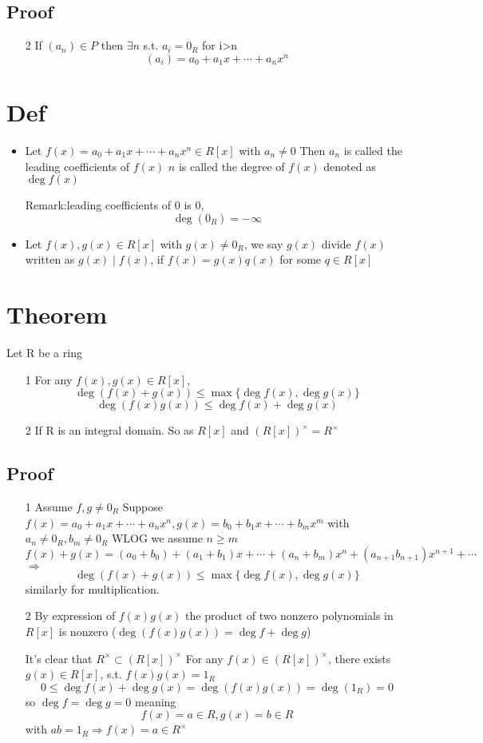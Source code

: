 \documentclass{book}
\begin{document}
\subsection*{Proof}
\begin{itemize}
	\item[2]If $(a_n)\in P$ then $\exists n$ s.t. $a_i=0_R$ for i>n$$(a_i)= a_0+a_1x+\cdots+a_nx^n$$
\end{itemize}
\section{Def}
\begin{itemize}
	\item Let $f(x)=a_0+a_1x+\cdots+a_nx^n\in R[x]$ with $a_n\neq 0$ Then $a_n$ is called the leading coefficients of $f(x)$ $n$ is called the degree of $f(x)$ denoted as $\deg f(x)$
	
	Remark:leading coefficients of 0 is 0, $$\deg(0_R)=-\infty$$
	\item Let $f(x),g(x)\in R[x]$ with $g(x)\neq 0_R$, we say $g(x)$ divide $f(x)$ written as $g(x)\mid f(x)$, if $f(x)=g(x)q(x)$ for some $q\in R[x]$
\end{itemize}
\section{Theorem}
Let R be a ring 
\begin{itemize}
	\item [1]For any $f(x),g(x)\in R[x]$, $$\deg(f(x)+g(x))\leq \max\{\deg f(x),\deg g(x)\}$$
	$$\deg(f(x)g(x))\leq\deg f(x)+\deg g(x)$$
	\item [2]If R is an integral domain. So as $R[x]$ and $(R[x])^\times=R^\times$
\end{itemize}
\subsection{Proof}
\begin{itemize}
	\item [1]Assume $f,g\neq 0_R$ Suppose $f(x)=a_0+a_1x+\cdots+a_nx^n,g(x)=b_0+b_1x+\cdots+b_mx^m$ with $a_n\neq 0_R,b_m\neq 0_R$ WLOG we assume $n\geq m$$$f(x)+g(x)=(a_0+b_0)+(a_1+b_1)x+\cdots+(a_n+b_m)x^n+(a_{n+1}b_{n+1})x^{n+1}+\cdots$$$\Rightarrow$$$\deg(f(x)+g(x))\leq \max\{\deg f(x),\deg g(x)\}$$ similarly for multiplication.
	\item [2]By expression of $f(x)g(x)$ the product of two nonzero polynomials in $R[x]$ is nonzero ($\deg(f(x)g(x))=\deg f+\deg g$)
	
	It's clear that $R^\times\subset(R[x])^\times$ For any $f(x)\in (R[x])^\times$, there exists $g(x)\in R[x]$, s.t. $f(x)g(x)=1_R$
	$$0\leq\deg f(x)+\deg g(x)=\deg(f(x)g(x))=\deg(1_R)=0$$ so $\deg f=\deg g=0$ meaning $$f(x)=a\in R,g(x)=b\in R$$ with $ab=1_R\Rightarrow f(x)=a\in R^\times$ 
\end{itemize}
\end{document}

